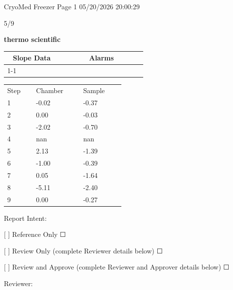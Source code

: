 \documentclass[UTF8,10pt,a4paper,fontset=fandol]{ctexart}
\newcommand{\fieldvalue}[1]{#1}
\newcommand{\handwritten}[1]{#1}
\newcommand{\checkboxfield}[1]{\ifstrequal{#1}{checked}{☑}{\ifstrequal{#1}{unclear}{?}{☐}}}
\begin{document}
\vfill

\noindent\small
CryoMed Freezer \hfill Page 1 \hfill 05/20/2026 20:00:29

\handwritten{5/9}

\newpage

\begin{center}
\textsf{\textbf{thermo scientific}}
\end{center}

\begin{tabular}{@{}p{0.32\linewidth}p{0.48\linewidth}@{}}
\multicolumn{1}{c}{Slope Data} & \multicolumn{1}{c}{Alarms} \\[-2pt]
\cline{1-1}\cline{2-2}
\end{tabular}

\vspace{0.05cm}

\begin{tabular}{@{}p{0.12\linewidth}p{0.18\linewidth}p{0.18\linewidth}@{}}
Step & Chamber & Sample \\
1 & -0.02 & -0.37 \\
2 & 0.00 & -0.03 \\
3 & -2.02 & -0.70 \\
4 & nan & nan \\
5 & 2.13 & -1.39 \\
6 & -1.00 & -0.39 \\
7 & 0.05 & -1.64 \\
8 & -5.11 & -2.40 \\
9 & 0.00 & -0.27 \\
\end{tabular}

\vspace{0.25cm}

Report Intent:

[ ] Reference Only \fieldvalue{\checkboxfield{unchecked}}

[ ] Review Only (complete Reviewer details below) \fieldvalue{\checkboxfield{unchecked}}

[ ] Review and Approve (complete Reviewer and Approver details below) \fieldvalue{\checkboxfield{unchecked}}

\vspace{0.1cm}

Reviewer:
\end{document}
